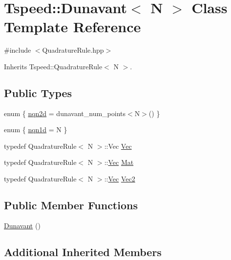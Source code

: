 \hypertarget{classTspeed_1_1Dunavant}{\section{Tspeed\-:\-:Dunavant$<$ N $>$ Class Template Reference}
\label{classTspeed_1_1Dunavant}
}


{\ttfamily \#include $<$Quadrature\-Rule.\-hpp$>$}



Inherits Tspeed\-::\-Quadrature\-Rule$<$ N $>$.

\subsection*{Public Types}
\begin{DoxyCompactItemize}
\item 
enum \{ \hyperlink{classTspeed_1_1Dunavant_a5490f3fa01eb0b3072ee657afc64053fa9142a1285dd27e2e329bf53154974324}{nqn2d} = dunavant\-\_\-num\-\_\-points$<$N$>$()
 \}
\item 
enum \{ \hyperlink{classTspeed_1_1Dunavant_a69286a2b90f14407f1133581a2667919a3ba00ee4f1fc556134ca24ff435e53eb}{nqn1d} = N
 \}
\item 
typedef Quadrature\-Rule$<$ N $>$\-::Vec \hyperlink{classTspeed_1_1Dunavant_a8562daa3d038126144415fa4ba851e81}{Vec}
\item 
typedef Quadrature\-Rule$<$ N $>$\-::\hyperlink{classTspeed_1_1Dunavant_a8562daa3d038126144415fa4ba851e81}{Vec} \hyperlink{classTspeed_1_1Dunavant_a87e65aed6cfa6ace8ea6374f3b005d78}{Mat}
\item 
typedef Quadrature\-Rule$<$ N $>$\-::\hyperlink{classTspeed_1_1Dunavant_a8562daa3d038126144415fa4ba851e81}{Vec} \hyperlink{classTspeed_1_1Dunavant_acc838f609850fd31cbbeb87578b1a8c5}{Vec2}
\end{DoxyCompactItemize}
\subsection*{Public Member Functions}
\begin{DoxyCompactItemize}
\item 
\hyperlink{classTspeed_1_1Dunavant_ac20f5d5f0ed9496a7b37a7ee082f635d}{Dunavant} ()
\end{DoxyCompactItemize}
\subsection*{Additional Inherited Members}


